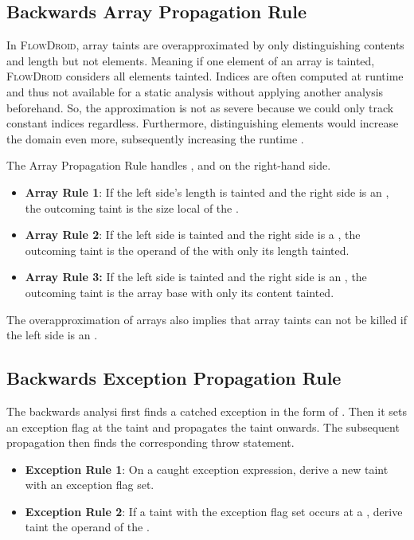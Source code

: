 \documentclass[../draft.tex]{subfiles}
\begin{document}
    \subsection{Backwards Array Propagation Rule}
    In \textsc{FlowDroid}, array taints are overapproximated by only distinguishing contents and length but not elements. Meaning if one element of an array is tainted, \textsc{FlowDroid} considers all elements tainted. 
    Indices are often computed at runtime and thus not available for a static analysis without applying another analysis beforehand. So, the approximation is not as severe because we could only track constant indices regardless. 
    Furthermore, distinguishing elements would increase the domain even more, subsequently increasing the runtime \cite{Arzt2017PhD}.  

    The Array Propagation Rule handles ,  and  on the right-hand side.

    \begin{itemize}
        \item \textbf{Array Rule 1}: If the left side's length is tainted and the right side is an , the outcoming taint is the size local of the .
        \item  \textbf{Array Rule 2}: If the left side is tainted and the right side is a , the outcoming taint is the operand of the  with only its length tainted.
        \item \textbf{Array Rule 3:} If the left side is tainted and the right side is an , the outcoming taint is the array base with only its content tainted.
    \end{itemize}

    The overapproximation of arrays also implies that array taints can not be killed if the left side is an .

    \subsection{Backwards Exception Propagation Rule}
    The backwards analysi first finds a catched exception in the form of . Then it sets an exception flag at the taint and propagates the taint onwards. The subsequent propagation then finds the corresponding throw statement.
    \begin{itemize}
        \item \textbf{Exception Rule 1}: On a caught exception expression, derive a new taint with an exception flag set.
        \item \textbf{Exception Rule 2}: If a taint with the exception flag set occurs at a , derive taint the operand of the . 
    \end{itemize}
\end{document}
